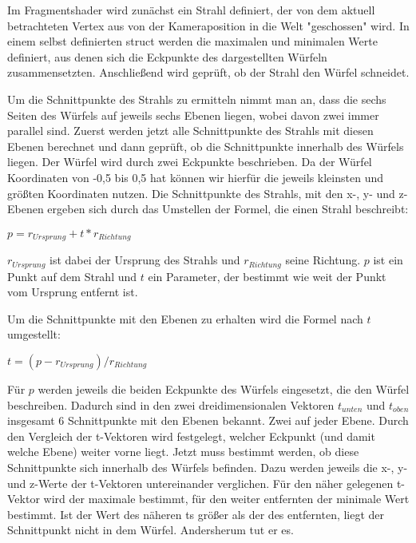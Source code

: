 Im Fragmentshader wird zunächst ein Strahl definiert, der von dem aktuell betrachteten Vertex aus von der Kameraposition in die Welt "geschossen" wird. In einem selbst definierten struct werden die maximalen und minimalen Werte definiert, aus denen sich die Eckpunkte des dargestellten Würfeln zusammensetzten. Anschließend wird geprüft, ob der Strahl den Würfel schneidet. 

Um die Schnittpunkte des Strahls zu ermitteln nimmt man an, dass die sechs Seiten des Würfels auf jeweils sechs Ebenen liegen, wobei davon zwei immer parallel sind. Zuerst werden jetzt alle Schnittpunkte des Strahls mit diesen Ebenen berechnet und dann geprüft, ob die Schnittpunkte innerhalb des Würfels liegen.
Der Würfel wird durch zwei Eckpunkte beschrieben. Da der Würfel Koordinaten von -0,5 bis 0,5 hat können wir hierfür die jeweils kleinsten und größten Koordinaten nutzen. 
Die Schnittpunkte des Strahls, mit den x-, y- und z-Ebenen ergeben sich durch das Umstellen der Formel, die einen Strahl beschreibt:

$p=r_{Ursprung}+t*r_{Richtung}$

$r_{Ursprung}$ ist dabei der Ursprung des Strahls und $r_{Richtung}$ seine Richtung. $p$ ist ein Punkt auf dem Strahl und $t$ ein Parameter, der bestimmt wie weit der Punkt vom Ursprung entfernt ist.

Um die Schnittpunkte mit den Ebenen zu erhalten wird die Formel nach $t$ umgestellt:

$t=(p-r_{Ursprung})/r_{Richtung}$

Für $p$ werden jeweils die beiden Eckpunkte des Würfels eingesetzt, die den Würfel beschreiben. Dadurch sind in den zwei dreidimensionalen Vektoren $t_{unten}$ und $t_{oben}$ insgesamt 6 Schnittpunkte mit den Ebenen bekannt. Zwei auf jeder Ebene. Durch den Vergleich der t-Vektoren wird festgelegt, welcher Eckpunkt (und damit welche Ebene) weiter vorne liegt. 
Jetzt muss bestimmt werden, ob diese Schnittpunkte sich innerhalb des Würfels befinden.
Dazu werden jeweils die x-, y- und z-Werte der t-Vektoren untereinander verglichen. Für den näher gelegenen t-Vektor wird der maximale bestimmt, für den weiter entfernten der minimale Wert bestimmt. Ist der Wert des näheren ts größer als der des entfernten, liegt der Schnittpunkt nicht in dem Würfel. Andersherum tut er es.

